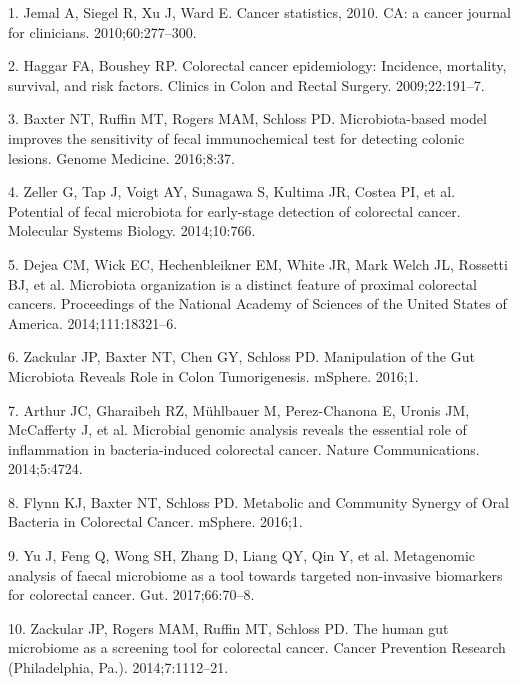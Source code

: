 \documentclass[12pt,]{article}
\begin{document}
\hypertarget{refs}{}
\hypertarget{ref-jemal_cancer_2010}{}
1. Jemal A, Siegel R, Xu J, Ward E. Cancer statistics, 2010. CA: a
cancer journal for clinicians. 2010;60:277--300.

\hypertarget{ref-haggar_colorectal_2009}{}
2. Haggar FA, Boushey RP. Colorectal cancer epidemiology: Incidence,
mortality, survival, and risk factors. Clinics in Colon and Rectal
Surgery. 2009;22:191--7.

\hypertarget{ref-baxter_microbiota-based_2016}{}
3. Baxter NT, Ruffin MT, Rogers MAM, Schloss PD. Microbiota-based model
improves the sensitivity of fecal immunochemical test for detecting
colonic lesions. Genome Medicine. 2016;8:37.

\hypertarget{ref-zeller_potential_2014}{}
4. Zeller G, Tap J, Voigt AY, Sunagawa S, Kultima JR, Costea PI, et al.
Potential of fecal microbiota for early-stage detection of colorectal
cancer. Molecular Systems Biology. 2014;10:766.

\hypertarget{ref-dejea_microbiota_2014}{}
5. Dejea CM, Wick EC, Hechenbleikner EM, White JR, Mark Welch JL,
Rossetti BJ, et al. Microbiota organization is a distinct feature of
proximal colorectal cancers. Proceedings of the National Academy of
Sciences of the United States of America. 2014;111:18321--6.

\hypertarget{ref-zackular_manipulation_2016}{}
6. Zackular JP, Baxter NT, Chen GY, Schloss PD. Manipulation of the Gut
Microbiota Reveals Role in Colon Tumorigenesis. mSphere. 2016;1.

\hypertarget{ref-arthur_microbial_2014}{}
7. Arthur JC, Gharaibeh RZ, Mühlbauer M, Perez-Chanona E, Uronis JM,
McCafferty J, et al. Microbial genomic analysis reveals the essential
role of inflammation in bacteria-induced colorectal cancer. Nature
Communications. 2014;5:4724.

\hypertarget{ref-flynn_metabolic_2016}{}
8. Flynn KJ, Baxter NT, Schloss PD. Metabolic and Community Synergy of
Oral Bacteria in Colorectal Cancer. mSphere. 2016;1.

\hypertarget{ref-yu_metagenomic_2017}{}
9. Yu J, Feng Q, Wong SH, Zhang D, Liang QY, Qin Y, et al. Metagenomic
analysis of faecal microbiome as a tool towards targeted non-invasive
biomarkers for colorectal cancer. Gut. 2017;66:70--8.

\hypertarget{ref-zackular_human_2014}{}
10. Zackular JP, Rogers MAM, Ruffin MT, Schloss PD. The human gut
microbiome as a screening tool for colorectal cancer. Cancer Prevention
Research (Philadelphia, Pa.). 2014;7:1112--21.
\end{document}
